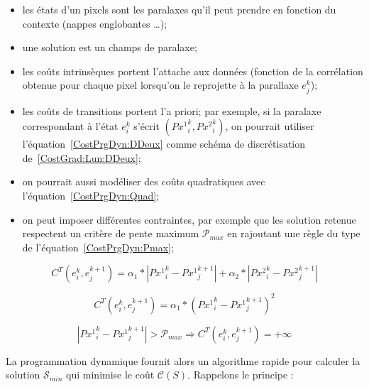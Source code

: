 {\begin{itemize}
    \item les \'etats d'un pixels sont les paralaxes qu'il peut prendre
          en fonction du contexte (nappes englobantes \dots);

    \item une solution est un champs de paralaxe;

    \item les co\^uts intrins\`eques portent  l'attache
          aux donn\'ees (fonction de la corr\'elation obtenue pour chaque pixel
          lorsqu'on le reprojette \`a la parallaxe $e^k_j$);

    \item les co\^uts  de transitions  portent  l'a priori;
          par exemple, si la paralaxe correspondant \`a
          l'\'etat $e^k_i$  s'\'ecrit $({Px^1}^k_i,{Px^2}^k_i)$, on pourrait
          utiliser l'\'equation~\ref{CostPrgDyn:DDeux} comme sch\'ema de
          discr\'etisation de~\ref{CostGrad:Lun:DDeux};

    \item on pourrait  aussi  mod\'eliser des co\^uts quadratiques avec
          l'\'equation~\ref{CostPrgDyn:Quad};

    \item on peut imposer diff\'erentes contraintes, par exemple
           que les solution retenue respectent un crit\`ere
          de pente maximum $ \mathcal P_{max}$  en rajoutant une r\`egle du type
          de l'\'equation~\ref{CostPrgDyn:Pmax};


\end{itemize}


\begin{equation}
\label{CostPrgDyn:DDeux}
C^T(e^k_i,e^{k+1}_j) =    \alpha_1* |{Px^1}^k_i-{Px^1}^{k+1}_j|
                          + \alpha_2* |{Px^2}^k_i-{Px^2}^{k+1}_j|
\end{equation}

\begin{equation}
\label{CostPrgDyn:Quad}
C^T(e^k_i,e^{k+1}_j) =    \alpha_1* ({Px^1}^k_i-{Px^1}^{k+1}_j)^2
\end{equation}

\begin{equation}
\label{CostPrgDyn:Pmax}
   |{Px^1}^k_i-{Px^1}^{k+1}_j| > \mathcal P_{max} \Rightarrow  C^T(e^k_i,e^{k+1}_j) = + \infty
\end{equation}


La programmation dynamique fournit alors un algorithme rapide pour
calculer la solution $\mathcal S_{min} $ qui minimise le
co\^ut $ \mathcal C (S) $.
Rappelons le principe :

}
